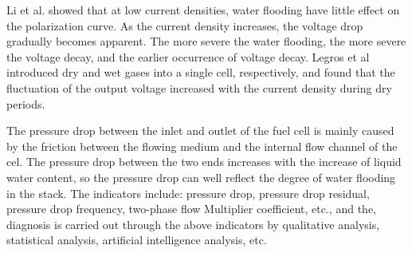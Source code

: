 \par
Li et al.\cite{liReviewWaterFlooding2008} showed that at low current densities, water flooding have little effect on the polarization curve. As the current density increases, the voltage drop gradually becomes apparent. The more severe the water flooding, the more severe the voltage decay, and the earlier occurrence of voltage decay. Legros et al\cite{legrosFirstResultsPEMFC2011} introduced dry and wet gases into a single cell, respectively, and found that the fluctuation of the output voltage increased with the current density during dry periods.
\par
The pressure drop between the inlet and outlet of the fuel cell is mainly caused by the friction between the flowing medium and the internal flow channel of the cel\cite{wuDiagnosticToolsPEM2008}. The pressure drop between the two ends increases with the increase of liquid water content, so the pressure drop can well reflect the degree of water flooding in the stack. The indicators include: pressure drop, pressure drop residual, pressure drop frequency, two-phase flow Multiplier coefficient, etc., and the, diagnosis is carried out through the above indicators by qualitative analysis, statistical analysis, artificial intelligence analysis, etc.\cite{liNovelApproachDetermine2017}
\par
